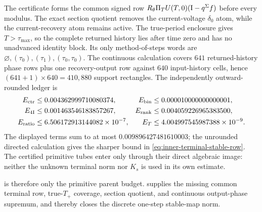 The certificate forms the common signed row
\(R_\theta\Pi_TU(T,0)(\mathrm I-q^\Sigma f)\) before every modulus.  The exact
section quotient removes the current-voltage \(\delta_0\) atom, while the
current-recovery atom remains active.  The true-period enclosure gives
\(T>\tau_{\max}\), so the complete returned history lies after time zero and
has no unadvanced identity block.  Its only method-of-steps words are
\(\varnothing,(\tau_0),(\tau_1),(\tau_0,\tau_0)\).  The continuous calculation
covers \(641\) returned-history phase rows plus one recovery-output row against
\(640\) input-history cells, hence \((641+1)\times640=410{,}880\) support
rectangles.  The independently outward-rounded ledger is
\begin{align*}
 E_{\rm ctr}&\le0.004362999710080374,
 &E_{\rm bin}&\le0.000010000000000001,\\
 E_{\rm 4I}&\le0.001463546183857267,
 &E_{\rm rank}&\le0.004059226965383500,\\
 E_{\rm ratio}&\le6.506172913144082\times10^{-7},
 &E_T&\le4.004997545987388\times10^{-9}.
\end{align*}
The displayed terms sum to at most \(0.009896427481610003\); the unrounded
directed calculation gives the sharper bound in
\cref{eq:inner-terminal-stable-row}.  The certified primitive tubes enter only
through their direct algebraic image: neither the unknown terminal norm nor
\(K_s\) is used in its own estimate.

 is therefore only the primitive parent
budget.
 supplies the missing common terminal
row, true-\(T_+\) coverage, section quotient, and continuous output-phase
supremum, and thereby closes the discrete one-step stable-map norm.

